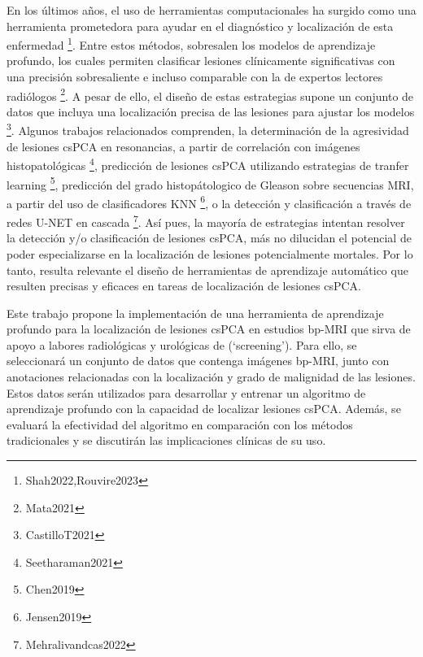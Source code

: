 En los últimos años, el uso de herramientas computacionales ha surgido como una herramienta prometedora para ayudar en el diagnóstico y localización de esta enfermedad \footnote{Shah2022,Rouvire2023}. Entre estos métodos, sobresalen los modelos de aprendizaje profundo, los cuales permiten clasificar lesiones clínicamente significativas con una precisión sobresaliente e incluso comparable con la de expertos lectores radiólogos \footnote{Mata2021}. A pesar de ello, el diseño de estas estrategias supone un conjunto de datos que incluya una localización precisa de las lesiones para ajustar los modelos \footnote{CastilloT2021}. Algunos trabajos relacionados comprenden, la determinación de la agresividad de lesiones csPCA en resonancias, a partir de correlación con imágenes histopatológicas \footnote{Seetharaman2021}, predicción de lesiones csPCA utilizando estrategias de tranfer learning \footnote{Chen2019}, predicción del grado histopátologico de Gleason sobre secuencias MRI, a partir del uso de clasificadores KNN \footnote{Jensen2019}, o la detección y clasificación a través de redes U-NET en cascada \footnote{Mehralivandcas2022}. Así pues, la mayoría de estrategias intentan resolver la detección y/o clasificación de lesiones csPCA, más no dilucidan el potencial de poder especializarse en la localización de lesiones potencialmente mortales. Por lo tanto, resulta relevante el diseño de herramientas de aprendizaje automático que resulten precisas y eficaces en tareas de localización de lesiones csPCA.

Este trabajo propone la implementación de una herramienta de aprendizaje profundo para la localización de lesiones csPCA en estudios bp-MRI que sirva de apoyo a labores radiológicas y urológicas de (`screening'). Para ello, se seleccionará un conjunto de datos que contenga imágenes bp-MRI, junto con anotaciones relacionadas con la localización y grado de malignidad de las lesiones. Estos datos serán utilizados para desarrollar y entrenar un algoritmo de aprendizaje profundo con la capacidad de localizar lesiones csPCA. Además, se evaluará la efectividad del algoritmo en comparación con los métodos tradicionales y se discutirán las implicaciones clínicas de su uso. 